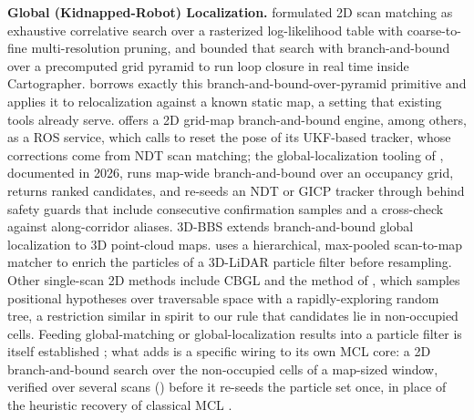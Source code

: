 \noindent\textbf{Global (Kidnapped-Robot) Localization.}
\citet{olson2009correlative} formulated 2D scan matching as exhaustive correlative search over a rasterized log-likelihood table with coarse-to-fine multi-resolution pruning, and \citet{hess2016realtime} bounded that search with branch-and-bound over a precomputed grid pyramid to run loop closure in real time inside Cartographer. \sname{} borrows exactly this branch-and-bound-over-pyramid primitive and applies it to relocalization against a known static map, a setting that existing tools already serve.  \citep{koide2021hdlgl} offers a 2D grid-map branch-and-bound engine, among others, as a ROS service, which  \citep{koide2019portable} calls to reset the pose of its UKF-based tracker, whose corrections come from NDT scan matching; the global-localization tooling of  \citep{sasaki2026globalloc}, documented in 2026, runs map-wide branch-and-bound over an occupancy grid, returns ranked candidates, and re-seeds an NDT or GICP tracker through  behind safety guards that include consecutive confirmation samples and a cross-check against along-corridor aliases. 3D-BBS \citep{aoki2024bbs3d} extends branch-and-bound global localization to 3D point-cloud maps. \citet{adurthi2023scan} uses a hierarchical, max-pooled scan-to-map matcher to enrich the particles of a 3D-LiDAR particle filter before resampling. Other single-scan 2D methods include CBGL \citep{filotheou2024cbgl} and the method of \citet{zhang2026krp}, which samples positional hypotheses over traversable space with a rapidly-exploring random tree, a restriction similar in spirit to our rule that candidates lie in non-occupied cells. Feeding global-matching or global-localization results into a particle filter is itself established \citep{adurthi2023scan,garcia2023mhamcl,akai2023reliable}; what \sname{} adds is a specific wiring to its own MCL core: a 2D branch-and-bound search over the non-occupied cells of a map-sized window, verified over several scans () before it re-seeds the particle set once, in place of the heuristic recovery of classical MCL \citep{fox1999efficient,thrun2001robust}.


